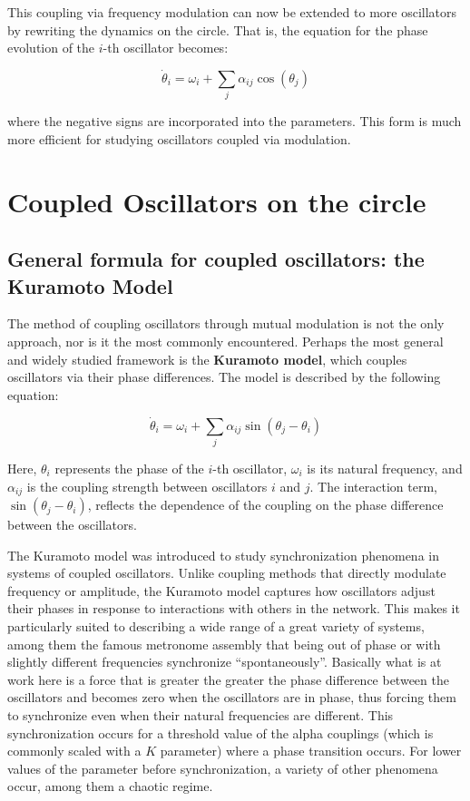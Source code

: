 \documentclass{article}
\begin{document}
This coupling via frequency modulation can now be extended to more oscillators by rewriting the dynamics on the circle. That is, the equation for the phase evolution of the $i$-th oscillator becomes:

\begin{equation} \label{eq_nmodulated}
    \dot{\theta}_i = \omega_i + \sum_j \alpha_{ij} \cos({\theta_j})
\end{equation}

where the negative signs are incorporated into the parameters. This form is much more efficient for studying oscillators coupled via modulation.



\section{Coupled Oscillators on the circle}

\subsection{General formula for coupled oscillators: the Kuramoto Model}

The method of coupling oscillators through mutual modulation is not the only approach, nor is it the most commonly encountered. Perhaps the most general and widely studied framework is the {\bf Kuramoto model}, which couples oscillators via their phase differences. The model is described by the following equation:


\begin{equation} \label{eq_kuramoto}
    \dot{\theta}_i = \omega_i + \sum_j \alpha_{ij} \sin({\theta_j}-{\theta_i})
\end{equation}

Here, $\theta_i$ represents the phase of the $i$-th oscillator, $\omega_i$ is its natural frequency, and $\alpha_{ij}$ is the coupling strength between oscillators $i$ and $j$. The interaction term, $\sin(\theta_j - \theta_i)$, reflects the dependence of the coupling on the phase difference between the oscillators.

The Kuramoto model was introduced to study synchronization phenomena in systems of coupled oscillators. 
Unlike coupling methods that directly modulate frequency or amplitude, the Kuramoto model captures how oscillators adjust their phases in response to interactions with others in the network. 
This makes it particularly suited to describing a wide range of a great variety of systems, among them the famous metronome assembly that being out of phase or with slightly different frequencies synchronize “spontaneously”. 
Basically what is at work here is a force that is greater the greater the phase difference between the oscillators and becomes zero when the oscillators are in phase, thus forcing them to synchronize even when their natural frequencies are different. 
This synchronization occurs for a threshold value of the alpha couplings (which is commonly scaled with a $K$ parameter) where a phase transition occurs.
For lower values of the parameter before synchronization, a variety of other phenomena occur, among them a chaotic regime.
\end{document}
